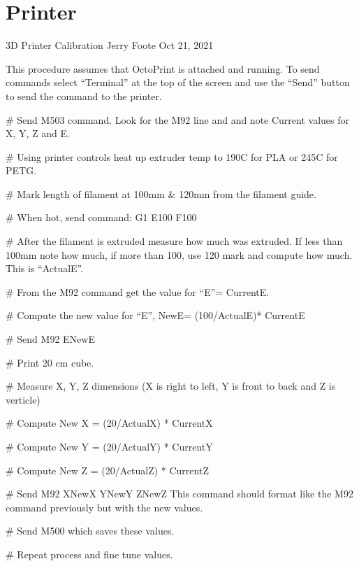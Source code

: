 \documentclass[letterpaper,10pt,english,openany,oneside]{sphinxmanual}
\begin{document}
\chapter{Printer}
\label{\detokenize{printer:printer}}\label{\detokenize{printer::doc}}
\sphinxAtStartPar
3D Printer Calibration
Jerry Foote Oct 21, 2021

\sphinxAtStartPar
This procedure assumes that OctoPrint is attached and running. To send commands select
“Terminal” at the top of the screen and use the “Send” button to send the command to the
printer.

\sphinxAtStartPar
\# Send M503 command. Look for the M92 line and and note Current values for X, Y, Z and E.

\sphinxAtStartPar
\# Using printer controls heat up extruder temp to 190C for PLA or 245C for PETG.

\sphinxAtStartPar
\# Mark length of filament at 100mm \& 120mm from the filament guide.

\sphinxAtStartPar
\# When hot, send command: G1 E100 F100

\sphinxAtStartPar
\# After the filament is extruded measure how much was extruded. If less than 100mm note how much, if more than 100, use 120 mark and compute how much. This is “ActualE”.

\sphinxAtStartPar
\# From the M92 command get the value for “E”= CurrentE.

\sphinxAtStartPar
\# Compute the new value for “E”, NewE= (100/ActualE)* CurrentE

\sphinxAtStartPar
\# Send M92 ENewE

\sphinxAtStartPar
\# Print 20 cm cube. 

\sphinxAtStartPar
\# Measure X, Y, Z dimensions (X is right to left, Y is front to back and Z is verticle)

\sphinxAtStartPar
\# Compute New X = (20/ActualX) * CurrentX

\sphinxAtStartPar
\# Compute New Y = (20/ActualY) * CurrentY

\sphinxAtStartPar
\# Compute New Z = (20/ActualZ) * CurrentZ

\sphinxAtStartPar
\# Send M92 XNewX YNewY ZNewZ This command should format like the M92 command previously but with the new values.

\sphinxAtStartPar
\# Send M500 which saves these values.

\sphinxAtStartPar
\# Repeat process and fine tune values.
\end{document}
